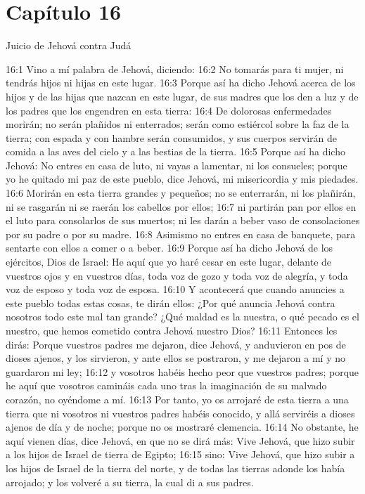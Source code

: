\section*{Capítulo 16 }
Juicio de Jehová contra Judá 
 
16:1 Vino a mí palabra de Jehová, diciendo: 
16:2 No tomarás para ti mujer, ni tendrás hijos ni hijas en este lugar. 
16:3 Porque así ha dicho Jehová acerca de los hijos y de las hijas que nazcan en este lugar, de sus madres que los den a luz y de los padres que los engendren en esta tierra: 
16:4 De dolorosas enfermedades morirán; no serán plañidos ni enterrados; serán como estiércol sobre la faz de la tierra; con espada y con hambre serán consumidos, y sus cuerpos servirán de comida a las aves del cielo y a las bestias de la tierra. 
16:5 Porque así ha dicho Jehová: No entres en casa de luto, ni vayas a lamentar, ni los consueles; porque yo he quitado mi paz de este pueblo, dice Jehová, mi misericordia y mis piedades. 
16:6 Morirán en esta tierra grandes y pequeños; no se enterrarán, ni los plañirán, ni se rasgarán ni se raerán los cabellos por ellos; 
16:7 ni partirán pan por ellos en el luto para consolarlos de sus muertos; ni les darán a beber vaso de consolaciones por su padre o por su madre. 
16:8 Asimismo no entres en casa de banquete, para sentarte con ellos a comer o a beber. 
16:9 Porque así ha dicho Jehová de los ejércitos, Dios de Israel: He aquí que yo haré cesar en este lugar, delante de vuestros ojos y en vuestros días, toda voz de gozo y toda voz de alegría, y toda voz de esposo y toda voz de esposa. 
16:10 Y acontecerá que cuando anuncies a este pueblo todas estas cosas, te dirán ellos: ¿Por qué anuncia Jehová contra nosotros todo este mal tan grande? ¿Qué maldad es la nuestra, o qué pecado es el nuestro, que hemos cometido contra Jehová nuestro Dios? 
16:11 Entonces les dirás: Porque vuestros padres me dejaron, dice Jehová, y anduvieron en pos de dioses ajenos, y los sirvieron, y ante ellos se postraron, y me dejaron a mí y no guardaron mi ley; 
16:12 y vosotros habéis hecho peor que vuestros padres; porque he aquí que vosotros camináis cada uno tras la imaginación de su malvado corazón, no oyéndome a mí. 
16:13 Por tanto, yo os arrojaré de esta tierra a una tierra que ni vosotros ni vuestros padres habéis conocido, y allá serviréis a dioses ajenos de día y de noche; porque no os mostraré clemencia. 
16:14 No obstante, he aquí vienen días, dice Jehová, en que no se dirá más: Vive Jehová, que hizo subir a los hijos de Israel de tierra de Egipto; 
16:15 sino: Vive Jehová, que hizo subir a los hijos de Israel de la tierra del norte, y de todas las tierras adonde los había arrojado; y los volveré a su tierra, la cual di a sus padres. 
